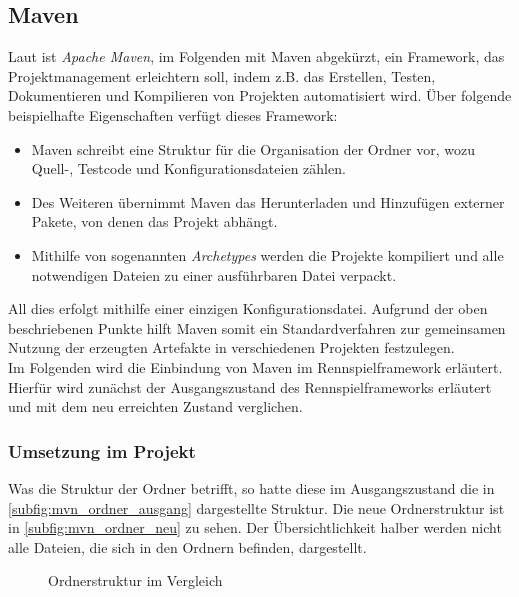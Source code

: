 %
%


\subsection{Maven} \label{sec:maven_grund}
Laut \cite[S. 1ff.]{Varanasi.2019} ist \textit{Apache Maven}, im Folgenden mit Maven abgekürzt, ein Framework, das Projektmanagement erleichtern soll, indem z.B. das Erstellen, Testen, Dokumentieren und Kompilieren von Projekten automatisiert wird. Über folgende beispielhafte Eigenschaften verfügt dieses Framework:
\begin{itemize}
\item Maven schreibt eine Struktur für die Organisation der Ordner vor, wozu Quell-, Testcode und Konfigurationsdateien zählen.
\item Des Weiteren übernimmt Maven das Herunterladen und Hinzufügen externer Pakete, von denen das Projekt abhängt. 
\item Mithilfe von sogenannten \textit{Archetypes} werden die Projekte kompiliert und alle notwendigen Dateien zu einer ausführbaren Datei verpackt.
\end{itemize}
All dies erfolgt mithilfe einer einzigen Konfigurationsdatei. Aufgrund der oben beschriebenen Punkte hilft Maven somit ein Standardverfahren zur gemeinsamen Nutzung der erzeugten Artefakte in verschiedenen Projekten festzulegen.\\
Im Folgenden wird die Einbindung von Maven im Rennspielframework erläutert. Hierfür wird zunächst der Ausgangszustand des Rennspielframeworks erläutert und mit dem neu erreichten Zustand verglichen.  

\subsubsection{Umsetzung im Projekt}
Was die Struktur der Ordner betrifft, so hatte diese im Ausgangszustand die in \autoref{subfig:mvn_ordner_ausgang} dargestellte Struktur. Die neue Ordnerstruktur ist in \autoref{subfig:mvn_ordner_neu} zu sehen. Der Übersichtlichkeit halber werden nicht alle Dateien, die sich in den Ordnern befinden, dargestellt.\\

\begin{figure}[h]
\centering
\begin{minipage}{0.4\textwidth}
\label{subfig:mvn_ordner_ausgang}
\end{minipage}
\qquad
\begin{minipage}{0.4\textwidth}
\label{subfig:mvn_ordner_neu}
\end{minipage}
\caption{Ordnerstruktur im Vergleich}
\label{fig:mvn_ordner}
\end{figure}

